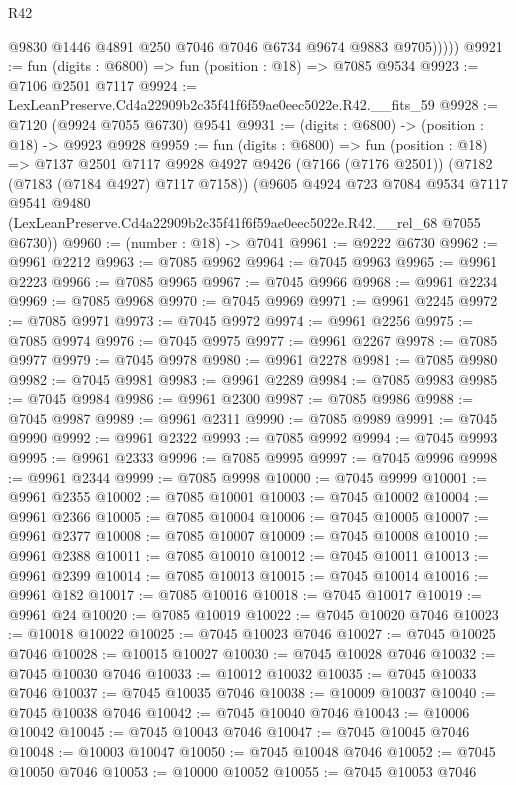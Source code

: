 \begin{lexlean}{R42}
\begin{coremodule}
{            @9830 @1446 @4891 @250 @7046 @7046 @6734 @9674 @9883 @9705)))))
@9921 := fun (digits : @6800) => fun (position : @18) => @7085 @9534
@9923 := @7106 @2501 @7117
@9924 := LexLeanPreserve.Cd4a22909b2c35f41f6f59ae0eec5022e.R42.__fits_59
@9928 := @7120 (@9924 @7055 @6730) @9541
@9931 := (digits : @6800) -> (position : @18) -> @9923 @9928
@9959 := fun (digits : @6800) =>
  fun (position : @18) =>
  @7137
    @2501
    @7117
    @9928
    @4927
    @9426
    (@7166 (@7176 @2501))
    (@7182 (@7183 (@7184 @4927) @7117 @7158))
    (@9605
      @4924
      @723
      @7084
      @9534
      @7117
      @9541
      @9480
      (LexLeanPreserve.Cd4a22909b2c35f41f6f59ae0eec5022e.R42.__rel_68 @7055 @6730))
@9960 := (number : @18) -> @7041
@9961 := @9222 @6730
@9962 := @9961 @2212
@9963 := @7085 @9962
@9964 := @7045 @9963
@9965 := @9961 @2223
@9966 := @7085 @9965
@9967 := @7045 @9966
@9968 := @9961 @2234
@9969 := @7085 @9968
@9970 := @7045 @9969
@9971 := @9961 @2245
@9972 := @7085 @9971
@9973 := @7045 @9972
@9974 := @9961 @2256
@9975 := @7085 @9974
@9976 := @7045 @9975
@9977 := @9961 @2267
@9978 := @7085 @9977
@9979 := @7045 @9978
@9980 := @9961 @2278
@9981 := @7085 @9980
@9982 := @7045 @9981
@9983 := @9961 @2289
@9984 := @7085 @9983
@9985 := @7045 @9984
@9986 := @9961 @2300
@9987 := @7085 @9986
@9988 := @7045 @9987
@9989 := @9961 @2311
@9990 := @7085 @9989
@9991 := @7045 @9990
@9992 := @9961 @2322
@9993 := @7085 @9992
@9994 := @7045 @9993
@9995 := @9961 @2333
@9996 := @7085 @9995
@9997 := @7045 @9996
@9998 := @9961 @2344
@9999 := @7085 @9998
@10000 := @7045 @9999
@10001 := @9961 @2355
@10002 := @7085 @10001
@10003 := @7045 @10002
@10004 := @9961 @2366
@10005 := @7085 @10004
@10006 := @7045 @10005
@10007 := @9961 @2377
@10008 := @7085 @10007
@10009 := @7045 @10008
@10010 := @9961 @2388
@10011 := @7085 @10010
@10012 := @7045 @10011
@10013 := @9961 @2399
@10014 := @7085 @10013
@10015 := @7045 @10014
@10016 := @9961 @182
@10017 := @7085 @10016
@10018 := @7045 @10017
@10019 := @9961 @24
@10020 := @7085 @10019
@10022 := @7045 @10020 @7046
@10023 := @10018 @10022
@10025 := @7045 @10023 @7046
@10027 := @7045 @10025 @7046
@10028 := @10015 @10027
@10030 := @7045 @10028 @7046
@10032 := @7045 @10030 @7046
@10033 := @10012 @10032
@10035 := @7045 @10033 @7046
@10037 := @7045 @10035 @7046
@10038 := @10009 @10037
@10040 := @7045 @10038 @7046
@10042 := @7045 @10040 @7046
@10043 := @10006 @10042
@10045 := @7045 @10043 @7046
@10047 := @7045 @10045 @7046
@10048 := @10003 @10047
@10050 := @7045 @10048 @7046
@10052 := @7045 @10050 @7046
@10053 := @10000 @10052
@10055 := @7045 @10053 @7046
}
\end{coremodule}
\end{lexlean}
